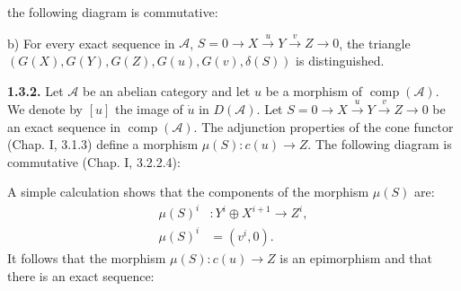 \clearpage
{}%
\begingroup\small\setlength{\parskip}{0pt}\setlength{\emergencystretch}{1.5em}
\setlength{\abovedisplayskip}{4pt plus 2pt minus 2pt}%
\setlength{\belowdisplayskip}{4pt plus 2pt minus 2pt}%

the following diagram is commutative:

\begin{center}
\end{center}

\noindent b) For every exact sequence in $\mathcal A$,
$S=0\longrightarrow X\xrightarrow{u}Y\xrightarrow{v}Z\longrightarrow0$,
the triangle
$(G(X),\allowbreak G(Y),\allowbreak G(Z),\allowbreak G(u),\allowbreak
G(v),\allowbreak\delta(S))$ is distinguished.

\medskip\noindent\textbf{1.3.2.}\quad
Let $\mathcal A$ be an abelian category and let $u$ be a morphism of
$\operatorname{comp}(\mathcal A)$. We denote by $[u]$ the image of
$\dot u$ in $D(\mathcal A)$. Let
$S=0\longrightarrow X\xrightarrow{u}Y\xrightarrow{v}Z\longrightarrow0$
be an exact sequence in $\operatorname{comp}(\mathcal A)$. The adjunction
properties of the cone functor (Chap. I, 3.1.3) define a morphism
$\mu(S)\colon c(u)\longrightarrow Z$. The following diagram is commutative
(Chap. I, 3.2.2.4):

\begin{center}
\end{center}

A simple calculation shows that the components of the morphism $\mu(S)$
are:
\begin{equation}
\begin{aligned}
\mu(S)^i&\colon Y^i\oplus X^{i+1}\longrightarrow Z^i,\\
\mu(S)^i&=(v^i,0).
\end{aligned}
\tag{1.3.2.1}
\end{equation}
It follows that the morphism $\mu(S)\colon c(u)\longrightarrow Z$ is an
epimorphism and that there is an exact sequence:

